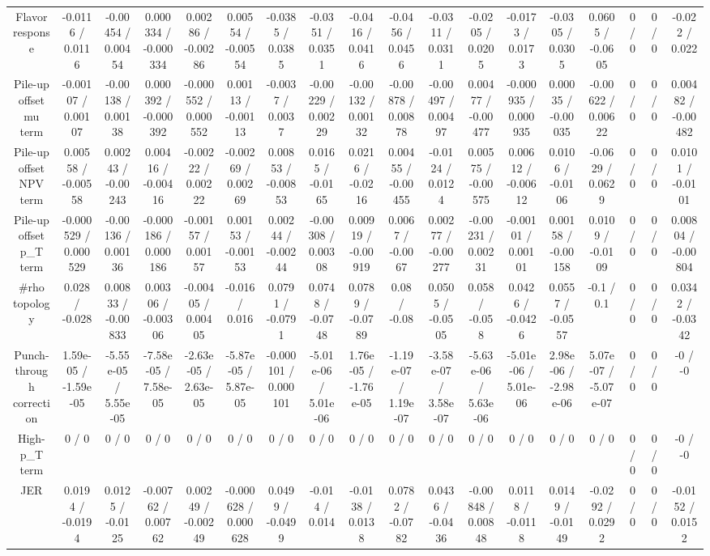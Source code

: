 \documentclass[10pt]{article}
\begin{document}
\begin{table}[htbp]
\begin{center}
\begin{tabular}{|c|c|c|c|c|c|c|c|c|c|c|c|c|c|c|c|c|c|}
  Flavor response & -0.0116 / 0.0116 & -0.00454 / 0.00454 & 0.000334 / -0.000334 & 0.00286 / -0.00286 & 0.00554 / -0.00554 & -0.0385 / 0.0385 & -0.0351 / 0.0351 & -0.0416 / 0.0416 & -0.0456 / 0.0456 & -0.0311 / 0.0311 & -0.0205 / 0.0205 & -0.0173 / 0.0173 & -0.0305 / 0.0305 & 0.0605 / -0.0605 & 0 / 0 & 0 / 0 & -0.022 / 0.022 \\ 
  Pile-up offset mu term & -0.00107 / 0.00107 & -0.00138 / 0.00138 & 0.000392 / -0.000392 & -0.000552 / 0.000552 & 0.00113 / -0.00113 & -0.0037 / 0.0037 & -0.00229 / 0.00229 & -0.00132 / 0.00132 & -0.00878 / 0.00878 & -0.00497 / 0.00497 & 0.00477 / -0.00477 & -0.000935 / 0.000935 & 0.00035 / -0.00035 & -0.00622 / 0.00622 & 0 / 0 & 0 / 0 & 0.00482 / -0.00482 \\ 
  Pile-up offset NPV term & 0.00558 / -0.00558 & 0.00243 / -0.00243 & 0.00416 / -0.00416 & -0.00222 / 0.00222 & -0.00269 / 0.00269 & 0.00853 / -0.00853 & 0.0165 / -0.0165 & 0.0216 / -0.0216 & 0.00455 / -0.00455 & -0.0124 / 0.0124 & 0.00575 / -0.00575 & 0.00612 / -0.00612 & 0.0106 / -0.0106 & -0.0629 / 0.0629 & 0 / 0 & 0 / 0 & 0.0101 / -0.0101 \\ 
  Pile-up offset p_{T} term & -0.000529 / 0.000529 & -0.00136 / 0.00136 & -0.000186 / 0.000186 & -0.00157 / 0.00157 & 0.00153 / -0.00153 & 0.00244 / -0.00244 & -0.00308 / 0.00308 & 0.00919 / -0.00919 & 0.0067 / -0.0067 & 0.00277 / -0.00277 & -0.00231 / 0.00231 & -0.00101 / 0.00101 & 0.00158 / -0.00158 & 0.0109 / -0.0109 & 0 / 0 & 0 / 0 & 0.00804 / -0.00804 \\ 
  #rho topology & 0.028 / -0.028 & 0.00833 / -0.00833 & 0.00306 / -0.00306 & -0.00405 / 0.00405 & -0.016 / 0.016 & 0.0791 / -0.0791 & 0.0748 / -0.0748 & 0.0789 / -0.0789 & 0.08 / -0.08 & 0.0505 / -0.0505 & 0.058 / -0.058 & 0.0426 / -0.0426 & 0.0557 / -0.0557 & -0.1 / 0.1 & 0 / 0 & 0 / 0 & 0.0342 / -0.0342 \\ 
  Punch-through correction & 1.59e-05 / -1.59e-05 & -5.55e-05 / 5.55e-05 & -7.58e-05 / 7.58e-05 & -2.63e-05 / 2.63e-05 & -5.87e-05 / 5.87e-05 & -0.000101 / 0.000101 & -5.01e-06 / 5.01e-06 & 1.76e-05 / -1.76e-05 & -1.19e-07 / 1.19e-07 & -3.58e-07 / 3.58e-07 & -5.63e-06 / 5.63e-06 & -5.01e-06 / 5.01e-06 & 2.98e-06 / -2.98e-06 & 5.07e-07 / -5.07e-07 & 0 / 0 & 0 / 0 & -0 / -0 \\ 
  High-p_{T} term & 0 / 0 & 0 / 0 & 0 / 0 & 0 / 0 & 0 / 0 & 0 / 0 & 0 / 0 & 0 / 0 & 0 / 0 & 0 / 0 & 0 / 0 & 0 / 0 & 0 / 0 & 0 / 0 & 0 / 0 & 0 / 0 & -0 / -0 \\ 
  JER & 0.0194 / -0.0194 & 0.0125 / -0.0125 & -0.00762 / 0.00762 & 0.00249 / -0.00249 & -0.000628 / 0.000628 & 0.0499 / -0.0499 & -0.014 / 0.014 & -0.0138 / 0.0138 & 0.0782 / -0.0782 & 0.0436 / -0.0436 & -0.00848 / 0.00848 & 0.0118 / -0.0118 & 0.0149 / -0.0149 & -0.0292 / 0.0292 & 0 / 0 & 0 / 0 & -0.0152 / 0.0152 \\ 

\end{tabular}
\end{center}
\end{table}
\end{document}
